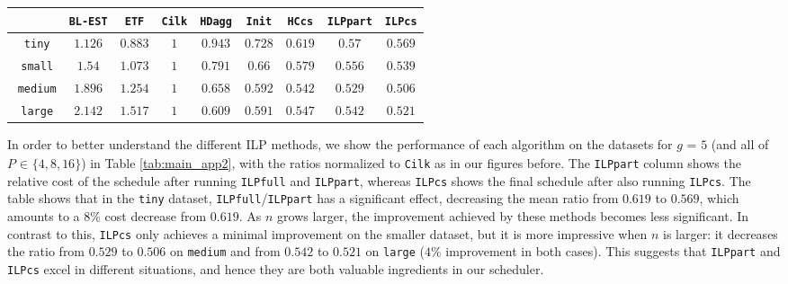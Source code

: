 \documentclass[sigconf,nonacm]{acmart}
\begin{document}
\begin{table*}[t]
    \centering
    \caption{Ratio of costs achieved by our algorithms (similarly to Figure \ref{fig:base_diag}), for $g=5$, on the different datasets.}
    \renewcommand{\arraystretch}{1.55}
    \begin{tabular}{c || c | c | c | c | c | c | c | c | }
     & \texttt{BL-EST} & \texttt{ETF} & \texttt{Cilk} & \texttt{HDagg} & \texttt{Init} & \texttt{HCcs} & \texttt{ILPpart} & \texttt{ILPcs} \\ [0.5ex] 
     \hline\hline
     $\!\!$ \texttt{tiny} & $1.126$ & $0.883$ & $\:1\:$ & $0.943$ & $0.728$ & $0.619$ & $0.57$ & $0.569$ \\ 
     \hline
     $\!\!$ \texttt{small} & $1.54$ & $1.073$ & $\:1\:$ & $0.791$ & $0.66$ & $0.579$ & $0.556$ & $0.539$ \\
     \hline
     $\!\!$ \texttt{medium} & $1.896$ & $1.254$ & $\:1\:$ & $0.658$ & $0.592$ & $0.542$ & $0.529$ & $0.506$ \\
     \hline
     $\!\!$ \texttt{large} & $2.142$ & $1.517$ & $\:1\:$ & $0.609$ & $0.591$ & $0.547$ & $0.542$ & $0.521$ \\
     \hline
    \end{tabular}
  \label{tab:main_app2}
\end{table*}

In order to better understand the different ILP methods, we show the performance of each algorithm on the datasets for $g _{\!}=_{\!}5$ (and all of $P _{\!} \in _{\!} \{ 4, 8, 16\}$) in Table \ref{tab:main_app2}, with the ratios normalized to \texttt{Cilk} as in our figures before. The \texttt{ILPpart} column shows the relative cost of the schedule after running \texttt{ILPfull} and \texttt{ILPpart}, whereas \texttt{ILPcs} shows the final schedule after also running \texttt{ILPcs}. The table shows that in the \texttt{tiny} dataset, \texttt{ILPfull}/\texttt{ILPpart} has a significant effect, decreasing the mean ratio from $0.619$ to $0.569$, which amounts to a $8\%$ cost decrease from $0.619$. As $n$ grows larger, the improvement achieved by these methods becomes less significant. In contrast to this, \texttt{ILPcs} only achieves a minimal improvement on the smaller dataset, but it is more impressive when $n$ is larger: it decreases the ratio from $0.529$ to $0.506$ on \texttt{medium} and from $0.542$ to $0.521$ on \texttt{large} ($4\%$ improvement in both cases). This suggests that \texttt{ILPpart} and \texttt{ILPcs} excel in different situations, and hence they are both valuable ingredients in our scheduler.
\end{document}
